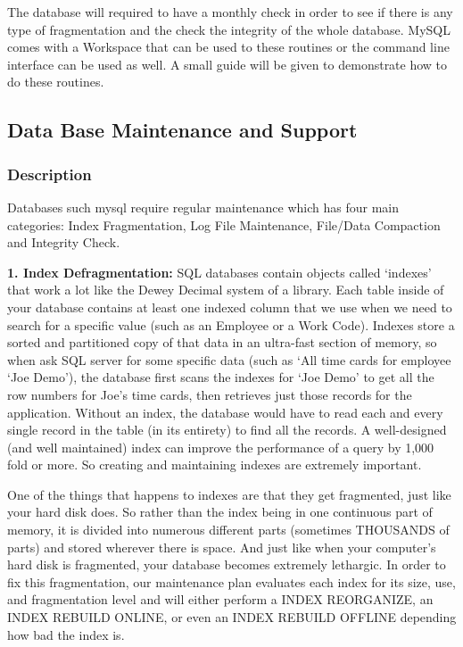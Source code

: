 The database will required to have a monthly check in order to see if there is any type of fragmentation and the check the integrity of the whole database. MySQL comes with a Workspace that can be used to these routines or the command line interface can be used as well. A small guide will be given to demonstrate how to do these routines.

\subsection{Data Base Maintenance and Support}
\subsubsection{Description}
Databases such mysql require regular maintenance which has four main categories: Index Fragmentation, Log File Maintenance, File/Data Compaction and Integrity Check.

\textbf{1. Index Defragmentation:}
SQL databases contain objects called ‘indexes’ that work a lot like the Dewey Decimal system of a library. Each table inside of your database contains at least one indexed column that we use when we need to search for a specific value (such as an Employee or a Work Code). Indexes store a sorted and partitioned copy of that data in an ultra-fast section of memory, so when ask SQL server for some specific data (such as ‘All time cards for employee ‘Joe Demo’), the database first scans the indexes for ‘Joe Demo’ to get all the row numbers for Joe’s time cards, then retrieves just those records for the application. Without an index, the database would have to read each and every single record in the table (in its entirety) to find all the records. A well-designed (and well maintained) index can improve the performance of a query by 1,000 fold or more. So creating and maintaining indexes are extremely important.

One of the things that happens to indexes are that they get fragmented, just like your hard disk does. So rather than the index being in one continuous part of memory, it is divided into numerous different parts (sometimes THOUSANDS of parts) and stored wherever there is space. And just like when your computer’s hard disk is fragmented, your database becomes extremely lethargic. In order to fix this fragmentation, our maintenance plan evaluates each index for its size, use, and fragmentation level and will either perform a INDEX REORGANIZE, an INDEX REBUILD ONLINE, or even an INDEX REBUILD OFFLINE depending how bad the index is.

